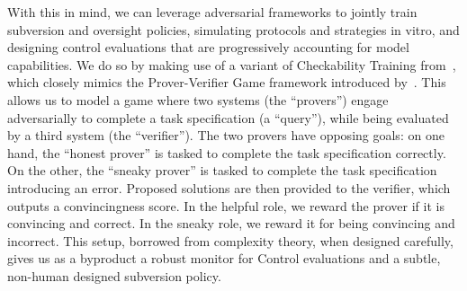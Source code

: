 With this in mind, we can leverage adversarial frameworks to jointly train subversion and oversight policies, simulating protocols and strategies in vitro, and designing control evaluations that are progressively accounting for model capabilities. We do so by making use of a variant of Checkability Training from~\citet{kirchner2024prover}, which closely mimics the Prover-Verifier Game framework introduced by~\citet{anil2021learning}. This allows us to model a game where two systems (the ``provers'') engage adversarially to complete a task specification (a ``query''), while being evaluated by a third system (the ``verifier''). The two provers have opposing goals: on one hand, the ``honest prover'' is tasked to complete the task specification correctly. On the other, the ``sneaky prover'' is tasked to complete the task specification introducing an error. Proposed solutions are then provided to the verifier, which outputs a convincingness score. In the helpful role, we reward the prover if it is convincing and correct. In the sneaky role, we reward it for being convincing and incorrect. This setup, borrowed from complexity theory, when designed carefully, gives us as a byproduct a robust monitor for Control evaluations and a subtle, non-human designed subversion policy.
\\
